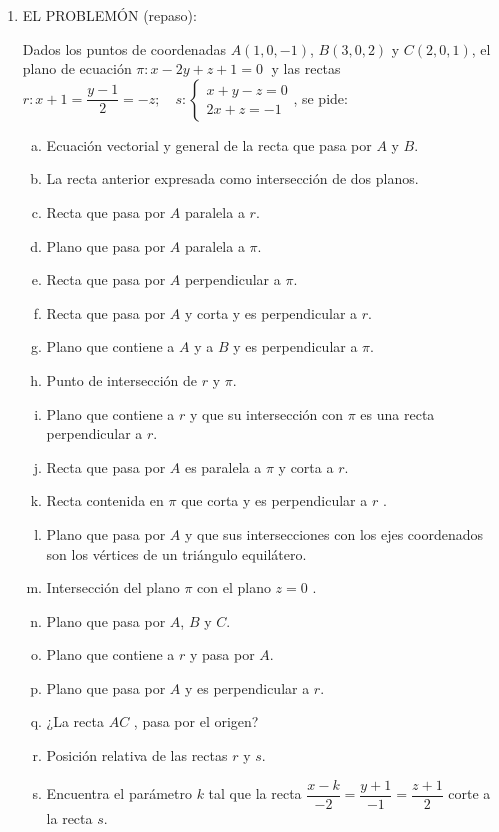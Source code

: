 \begin{enumerate}


\item EL PROBLEMÓN (repaso):

Dados los puntos de coordenadas $A(1,0,-1)$, $B(3,0,2)$ y $C(2,0,1)$, el plano de ecuación $\pi:x-2y+z+1=0\;$ y  
las rectas  $r:x+1=\dfrac{y-1}2=-z;\quad s:\begin{cases}x+y-z=0\\2x+z=-1\end{cases}$, se pide:

\begin{enumerate}[a) ]
\item Ecuación vectorial y general de la recta que pasa por $A$ y $B$.
\item La recta anterior expresada como intersección de dos planos.
\item Recta que pasa por $A$ paralela a $r$.
\item Plano que pasa por $A$ paralela a $\pi$.
\item Recta que pasa por $A$ perpendicular a $\pi$.
\item Recta que pasa por $A$ y corta y es perpendicular a $r$.
\item Plano que contiene a $A$ y a $B$ y es perpendicular a $\pi$.
\item Punto de intersección de $r$ y $\pi$.
\item Plano que contiene a $r$ y que su intersección con $\pi$ es una recta perpendicular a $r$.
\item Recta que pasa por $A$ es paralela a $\pi$ y corta a $r$.
\item Recta contenida en $\pi$ que corta y es perpendicular a $r$ .
\item Plano que pasa por $A$ y que sus intersecciones con los ejes coordenados son los vértices de un triángulo equilátero.
\item  Intersección del plano $\pi$  con el plano $z=0$ .
\item Plano que pasa por $A$, $B$ y $C$.
\item Plano que contiene a $r$ y pasa por $A$.
\item Plano que pasa por $A$ y es perpendicular a $r$.
\item ¿La recta $AC$ , pasa por el origen?
\item Posición relativa de las rectas $r$ y $s$.
\item Encuentra el parámetro $k$ tal que la recta $\dfrac{x-k}{-2}=\dfrac{y+1}{-1}= \dfrac{z+1}{2}$  corte a la recta $s$.

\end{enumerate}
\end{enumerate}
